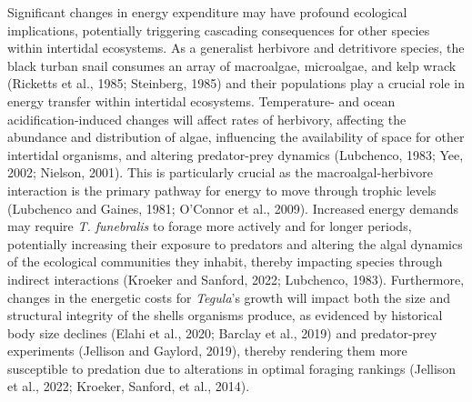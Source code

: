 \documentclass{CSUNthesis}
\begin{document}
Significant changes in energy expenditure may have profound ecological implications, potentially triggering cascading consequences for other species within intertidal ecosystems. As a generalist herbivore and detritivore species, the black turban snail consumes an array of macroalgae, microalgae, and kelp wrack (Ricketts et al., 1985; Steinberg, 1985) and their populations play a crucial role in energy transfer within intertidal ecosystems. Temperature- and ocean acidification-induced changes will affect rates of herbivory, affecting the abundance and distribution of algae, influencing the availability of space for other intertidal organisms, and altering predator-prey dynamics (Lubchenco, 1983; Yee, 2002; Nielson, 2001). This is particularly crucial as the macroalgal-herbivore interaction is the primary pathway for energy to move through trophic levels (Lubchenco and Gaines, 1981; O'Connor et al., 2009). Increased energy demands may require \textit{T. funebralis} to forage more actively and for longer periods, potentially increasing their exposure to predators and altering the algal dynamics of the ecological communities they inhabit, thereby impacting species through indirect interactions (Kroeker and Sanford, 2022; Lubchenco, 1983). Furthermore, changes in the energetic costs for \textit{Tegula}'s growth will impact both the size and structural integrity of the shells organisms produce, as evidenced by historical body size declines (Elahi et al., 2020; Barclay et al., 2019) and predator-prey experiments (Jellison and Gaylord, 2019), thereby rendering them more susceptible to predation due to alterations in optimal foraging rankings (Jellison et al., 2022; Kroeker, Sanford, et al., 2014).
\end{document}
